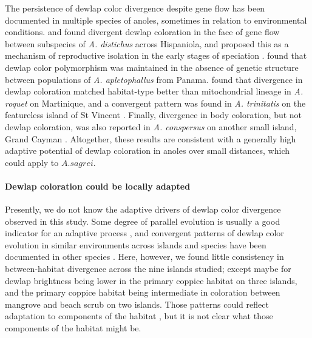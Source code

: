 The persistence of dewlap color divergence despite gene flow has been documented in multiple species of anoles, sometimes in relation to environmental conditions. \citet{Ng2012} and \citet{Ng2016} found divergent dewlap coloration in the face of gene flow between subspecies of \textit{A. distichus} across Hispaniola, and proposed this as a mechanism of reproductive isolation in the early stages of speciation \citep{Ng2011, Lambert2013, Ng2017}. \citet{Stapley2011} found that dewlap color polymorphism was maintained in the absence of genetic structure between populations of \textit{A. apletophallus} from Panama. \citet{Thorpe2002a} found that divergence in dewlap coloration matched habitat-type better than mitochondrial lineage in \textit{A. roquet} on Martinique, and a convergent pattern was found in \textit{A. trinitatis} on the featureless island of St Vincent \citep{Thorpe2002b}. Finally, divergence in body coloration, but not dewlap coloration, was also reported in \textit{A. conspersus} on another small island, Grand Cayman \citep{Macedonia2001}. Altogether, these results are consistent with a generally high adaptive potential of dewlap coloration in anoles over small distances, which could apply to $A. sagrei$.


\paragraph{Dewlap coloration could be locally adapted} Presently, we do not know the adaptive drivers of dewlap color divergence observed in this study. Some degree of parallel evolution is usually a good indicator for an adaptive process \citep{Losos2011}, and convergent patterns of dewlap color evolution in similar environments across islands and species have been documented in other species \citep{Thorpe2002a, Thorpe2002b}. Here, however, we found little consistency in between-habitat divergence across the nine islands studied; except maybe for dewlap brightness being lower in the primary coppice habitat on three islands, and the primary coppice habitat being intermediate in coloration between mangrove and beach scrub on two islands. Those patterns could reflect adaptation to components of the habitat \citep{Endler1988}, but it is not clear what those components of the habitat might be.\\

